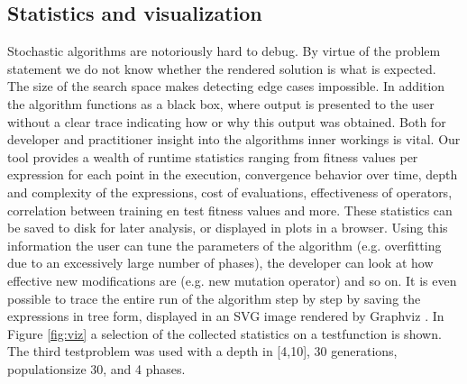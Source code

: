 \subsection{Statistics and visualization}
Stochastic algorithms are notoriously hard to debug. By virtue of the problem statement we do not know whether the rendered solution is what is expected. The size of the search space makes detecting edge cases impossible. In addition the algorithm functions as a black box, where output is presented to the user without a clear trace indicating how or why this output was obtained. Both for developer and practitioner insight into the algorithms inner workings is vital. 
Our tool provides a wealth of runtime statistics ranging from fitness values per expression for each point in the execution, convergence behavior over time, depth and complexity of the expressions, cost of evaluations, effectiveness of operators, correlation between training en test fitness values and more. These statistics can be saved to disk for later analysis, or displayed in plots in a browser. Using this information the user can tune the parameters of the algorithm (e.g. overfitting due to an excessively large number of phases), the developer can look at how effective new modifications are (e.g. new mutation operator) and so on.
It is even possible to trace the entire run of the algorithm step by step by saving the expressions in tree form, displayed in an SVG image rendered by Graphviz \cite{graphviz}. In Figure \ref{fig:viz} a selection of the collected statistics on a testfunction is shown. The third testproblem was used with a depth in [4,10], 30 generations, populationsize 30, and 4 phases.
